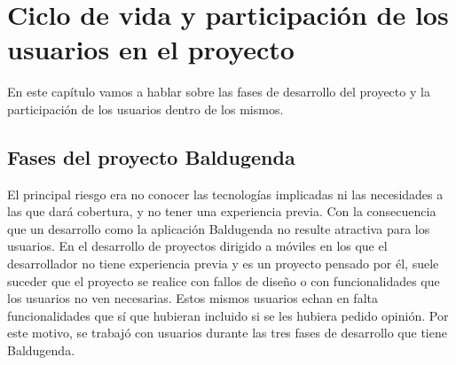 \chapter{Ciclo de vida y participación de los usuarios en el proyecto}
\label{ch:ciclo de vida}



En este capítulo vamos a hablar sobre las fases de desarrollo del proyecto y la participación de los usuarios dentro de los mismos.

\section{Fases del proyecto Baldugenda}
\label{secc:Fases del proyecto Baldugenda}

El principal riesgo era no conocer las tecnologías implicadas ni las necesidades a las que dará cobertura, y no tener una experiencia previa. Con la consecuencia que un desarrollo como la aplicación Baldugenda no resulte atractiva para los usuarios. En el desarrollo de proyectos dirigido a móviles en los que el desarrollador no tiene experiencia previa y es un proyecto pensado por él, suele suceder que el proyecto se realice con fallos de diseño o con funcionalidades que los usuarios no ven necesarias. Estos mismos usuarios echan en falta funcionalidades que sí que hubieran incluido si se les hubiera pedido opinión. 
Por este motivo, se trabajó con usuarios durante las tres fases de desarrollo que tiene Baldugenda.

